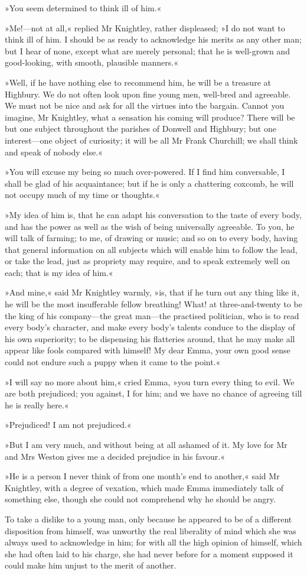 »You seem determined to think ill of him.«

»Me!—not at all,« replied Mr Knightley, rather displeased; »I do not want to think ill of him. I should be as ready to acknowledge his merits as any other man; but I hear of none, except what are merely personal; that he is well-grown and good-looking, with smooth, plausible manners.«

»Well, if he have nothing else to recommend him, he will be a treasure at Highbury. We do not often look upon fine young men, well-bred and agreeable. We must not be nice and ask for all the virtues into the bargain. Cannot you imagine, Mr Knightley, what a sensation his coming will produce? There will be but one subject throughout the parishes of Donwell and Highbury; but one interest—one object of curiosity; it will be all Mr Frank Churchill; we shall think and speak of nobody else.«

»You will excuse my being so much over-powered. If I find him conversable, I shall be glad of his acquaintance; but if he is only a chattering coxcomb, he will not occupy much of my time or thoughts.«

»My idea of him is, that he can adapt his conversation to the taste of every body, and has the power as well as the wish of being universally agreeable. To you, he will talk of farming; to me, of drawing or music; and so on to every body, having that general information on all subjects which will enable him to follow the lead, or take the lead, just as propriety may require, and to speak extremely well on each; that is my idea of him.«

»And mine,« said Mr Knightley warmly, »is, that if he turn out any thing like it, he will be the most insufferable fellow breathing! What! at three-and-twenty to be the king of his company—the great man—the practised politician, who is to read every body's character, and make every body's talents conduce to the display of his own superiority; to be dispensing his flatteries around, that he may make all appear like fools compared with himself! My dear Emma, your own good sense could not endure such a puppy when it came to the point.«

»I will say no more about him,« cried Emma, »you turn every thing to evil. We are both prejudiced; you against, I for him; and we have no chance of agreeing till he is really here.«

»Prejudiced! I am not prejudiced.«

»But I am very much, and without being at all ashamed of it. My love for Mr and Mrs Weston gives me a decided prejudice in his favour.«

»He is a person I never think of from one month's end to another,« said Mr Knightley, with a degree of vexation, which made Emma immediately talk of something else, though she could not comprehend why he should be angry.

To take a dislike to a young man, only because he appeared to be of a different disposition from himself, was unworthy the real liberality of mind which she was always used to acknowledge in him; for with all the high opinion of himself, which she had often laid to his charge, she had never before for a moment supposed it could make him unjust to the merit of another.
